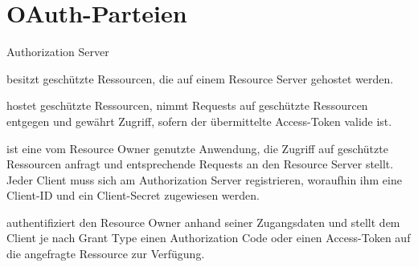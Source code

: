 \section{OAuth-Parteien}\label{Parteien}
\begin{labeling}{Authorization Server}
    \item [Resource Owner] besitzt geschützte Ressourcen, die auf einem Resource
    Server gehostet werden.
    \item [Resource Server] hostet geschützte Ressourcen, nimmt Requests auf
    geschützte Ressourcen entgegen und gewährt Zugriff, sofern der übermittelte
    Access-Token valide ist.
    \item [Client Application] ist eine vom Resource Owner genutzte Anwendung,
    die Zugriff auf geschützte Ressourcen anfragt und entsprechende Requests an
    den Resource Server stellt. Jeder Client muss sich am Authorization Server
    registrieren, woraufhin ihm eine Client-ID und ein Client-Secret zugewiesen
    werden.
    \item[Authorization Server] authentifiziert den Resource Owner anhand seiner
    Zugangsdaten und stellt dem Client je nach \gls{Grant Type} einen
    Authorization Code oder einen Access-Token auf die angefragte Ressource zur
    Verfügung. 
\end{labeling}
